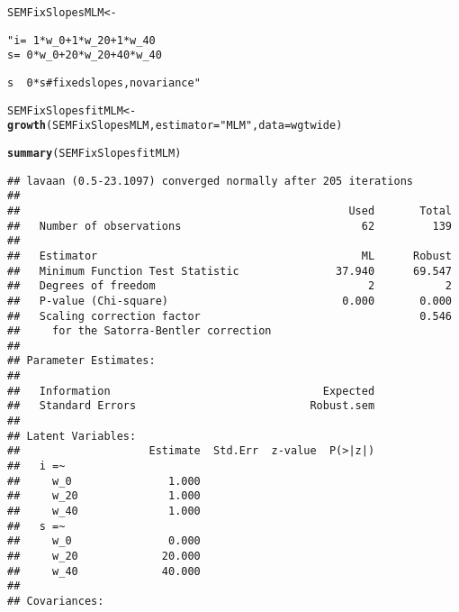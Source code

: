 \documentclass{article}\usepackage[]{graphicx}\usepackage[]{color}
\makeatletter
\newcommand{\hlstr}[1]{\textcolor[rgb]{0.192,0.494,0.8}{#1}}%
\newcommand{\hlstd}[1]{\textcolor[rgb]{0.345,0.345,0.345}{#1}}%
\newcommand{\hlkwb}[1]{\textcolor[rgb]{0.69,0.353,0.396}{#1}}%
\newcommand{\hlkwc}[1]{\textcolor[rgb]{0.333,0.667,0.333}{#1}}%
\newcommand{\hlkwd}[1]{\textcolor[rgb]{0.737,0.353,0.396}{\textbf{#1}}}%
\newenvironment{kframe}{%
 \def\at@end@of@kframe{}%
 \ifinner\ifhmode%
  \def\at@end@of@kframe{\end{minipage}}%
  \begin{minipage}{\columnwidth}%
 \fi\fi%
 \def\FrameCommand##1{\hskip\@totalleftmargin \hskip-\fboxsep
 \colorbox{shadecolor}{##1}\hskip-\fboxsep
     \hskip-\linewidth \hskip-\@totalleftmargin \hskip\columnwidth}%
 \MakeFramed {\advance\hsize-\width
   \@totalleftmargin\z@ \linewidth\hsize
   \@setminipage}}%
 {\par\unskip\endMakeFramed%
 \at@end@of@kframe}
\newenvironment{knitrout}{}{} %
\makeatother
\begin{document}
\begin{knitrout}
\color{fgcolor}\begin{kframe}
\begin{alltt}
\hlstd{SEMFixSlopesMLM} \hlkwb{<-} \hlstr{" i =~ 1*w_0 + 1*w_20 + 1*w_40
                  s =~ 0*w_0 + 20*w_20 + 40*w_40

                  s ~~ 0*s #fixed slopes, no variance"}
\hlstd{SEMFixSlopesfitMLM} \hlkwb{<-} \hlkwd{growth}\hlstd{(SEMFixSlopesMLM,} \hlkwc{estimator} \hlstd{=} \hlstr{"MLM"}\hlstd{,} \hlkwc{data} \hlstd{= wgtwide)}
\end{alltt}


{\ttfamily\noindent{}}\begin{alltt}
\hlkwd{summary}\hlstd{(SEMFixSlopesfitMLM)}
\end{alltt}
\begin{verbatim}
## lavaan (0.5-23.1097) converged normally after 205 iterations
## 
##                                                   Used       Total
##   Number of observations                            62         139
## 
##   Estimator                                         ML      Robust
##   Minimum Function Test Statistic               37.940      69.547
##   Degrees of freedom                                 2           2
##   P-value (Chi-square)                           0.000       0.000
##   Scaling correction factor                                  0.546
##     for the Satorra-Bentler correction
## 
## Parameter Estimates:
## 
##   Information                                 Expected
##   Standard Errors                           Robust.sem
## 
## Latent Variables:
##                    Estimate  Std.Err  z-value  P(>|z|)
##   i =~                                                
##     w_0               1.000                           
##     w_20              1.000                           
##     w_40              1.000                           
##   s =~                                                
##     w_0               0.000                           
##     w_20             20.000                           
##     w_40             40.000                           
## 
## Covariances:

\end{verbatim}
\end{kframe}
\end{knitrout}
\end{document}
